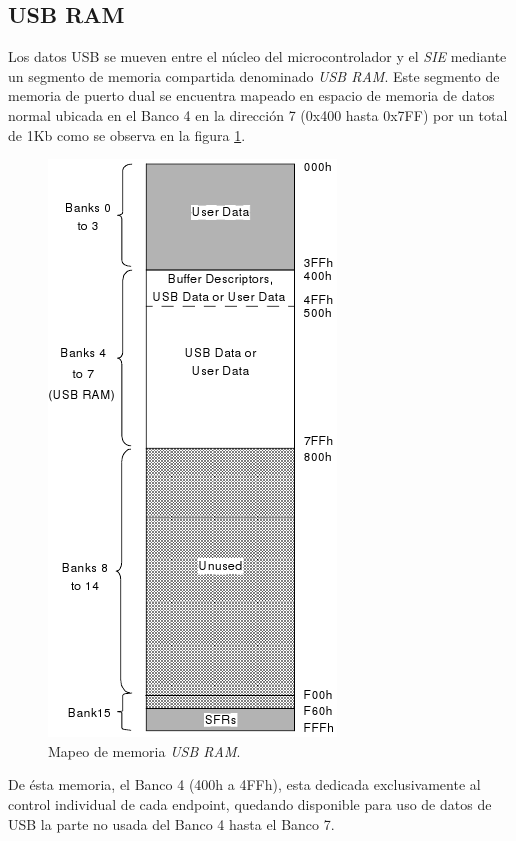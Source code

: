 \subsection{USB RAM}
Los datos USB se mueven entre el n\'ucleo del microcontrolador y el \emph{SIE}
mediante un segmento de memoria compartida denominado \emph{USB RAM}.
Este segmento de memoria de puerto dual se encuentra mapeado en espacio de
memoria de datos normal ubicada en el Banco 4 en la direcci\'on 7 (0x400 hasta
0x7FF) por un total de 1Kb como se observa en la figura \ref{fig:usb_mem}.

\begin{figure}[htp]
\centering
\includegraphics[scale=0.6]{./img/usb_mem.png}
\caption{Mapeo de memoria \emph{USB RAM}.}
\label{fig:usb_mem}
\end{figure}

De \'esta memoria, el Banco 4 (400h a 4FFh), esta dedicada exclusivamente al
control individual de cada endpoint, quedando disponible para uso de datos de
USB la parte no usada del Banco 4 hasta el Banco 7.\\

